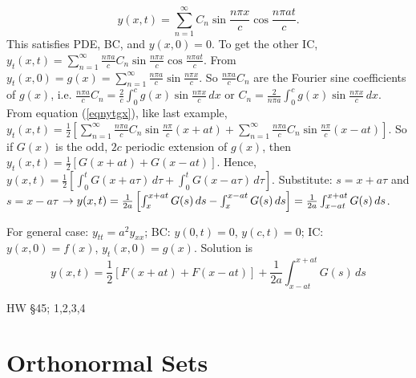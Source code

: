 \documentclass[]{article}
\begin{document}
\begin{equation}
	y(x,t) = \sum_{n=1}^\infty C_n \sin{\frac{n\pi x}{c}} \cos{\frac{n\pi a t}{c}}.
	\label{eqnytgx}
\end{equation}
This satisfies PDE, BC, and $y(x,0)=0$. To get the other IC, $y_t(x,t) =\sum_{n=1}^\infty \frac{n\pi a}{c} C_n \sin{\frac{n\pi x}{c}} \cos{\frac{n\pi at}{c}}$. From $y_t(x,0) = g(x) = \sum_{n=1}^\infty \frac{n\pi a}{c} \sin{\frac{n\pi x}{c}}$. So $\frac{n\pi a}{c} C_n$ are the Fourier sine coefficients of $g(x)$, i.e. $\frac{n\pi a}{c} C_n = \frac{2}{c} \int_0^c g(x) \sin{\frac{n\pi x}{c}} \, dx$ or $C_n = \frac{2}{n\pi a} \int_0^c g(x) \sin{\frac{n\pi x}{c}}\, dx$.
From equation (\ref{eqnytgx}), like last example, $y_t(x,t) = \frac{1}{2} \left[ \sum_{n=1}^\infty \frac{n\pi a}{c} C_n \sin{\frac{n\pi}{c}(x+at)} + \sum_{n=1}^\infty \frac{n\pi a}{c} C_n \sin{\frac{n\pi}{c}(x-at)} \right]$. So if $G(x)$ is the odd, $2c$ periodic extension of $g(x)$, then $y_t(x,t) = \frac{1}{2} [G(x+at) + G(x-at)]$. Hence, $y(x,t) = \frac{1}{2} \left[ \int_0^t G(x+a\tau) \, d\tau + \int_0^t G(x-a\tau) \, d\tau \right]$. Substitute: $s = x+a\tau$ and $s=x-a\tau$ $\rightarrow y(x,t) = \frac{1}{2a} \left[ \int_x^{x+at} G(s) \, ds - \int_x^{x-at} G(s) \, ds \right] = \frac{1}{2a} \int_{x-at}^{x+at} G(s) \, ds$.

For general case: $y_{tt} = a^2 y_{xx}$; BC: $y(0,t) = 0$, $y(c,t) = 0$; IC: $y(x,0) = f(x)$, $y_t(x,0) = g(x)$. Solution is $$\displaystyle y(x,t) = \frac{1}{2} [F(x+at)+F(x-at)] + \frac{1}{2a} \int_{x-at}^{x+at} G(s)\, ds$$

HW \S45; 1,2,3,4

\newpage

\section{Orthonormal Sets}
\end{document}
